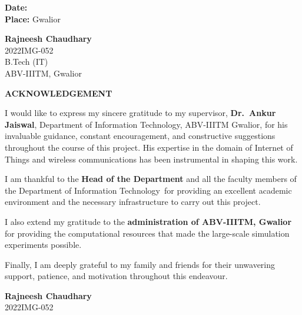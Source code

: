 \documentclass[12pt, a4paper, oneside]{report}
\newcommand{\authorname}{Rajneesh Chaudhary}
\newcommand{\rollno}{2022IMG-052}
\newcommand{\supervisor}{Dr.\ Ankur Jaiswal}
\newcommand{\department}{Department of Information Technology}
\begin{document}
\vspace{3cm}

\noindent
\begin{minipage}[t]{0.45\textwidth}
\textbf{Date:}\\
\textbf{Place:} Gwalior
\end{minipage}
\hfill
\begin{minipage}[t]{0.45\textwidth}
\raggedleft
\textbf{\authorname}\\
\rollno\\
B.Tech (IT)\\
ABV-IIITM, Gwalior
\end{minipage}

\clearpage
\thispagestyle{plain}
\begin{center}
{\LARGE \textbf{ACKNOWLEDGEMENT}}
\end{center}
\vspace{1cm}

I would like to express my sincere gratitude to my supervisor, \textbf{\supervisor}, \department, ABV-IIITM Gwalior, for his invaluable guidance, constant encouragement, and constructive suggestions throughout the course of this project. His expertise in the domain of Internet of Things and wireless communications has been instrumental in shaping this work.

\vspace{0.5cm}

I am thankful to the \textbf{Head of the Department} and all the faculty members of the \department\ for providing an excellent academic environment and the necessary infrastructure to carry out this project.

\vspace{0.5cm}

I also extend my gratitude to the \textbf{administration of ABV-IIITM, Gwalior} for providing the computational resources that made the large-scale simulation experiments possible.

\vspace{0.5cm}

Finally, I am deeply grateful to my family and friends for their unwavering support, patience, and motivation throughout this endeavour.

\vspace{2cm}

\noindent
\hfill
\begin{minipage}[t]{0.45\textwidth}
\raggedleft
\textbf{\authorname}\\
\rollno
\end{minipage}
\end{document}
